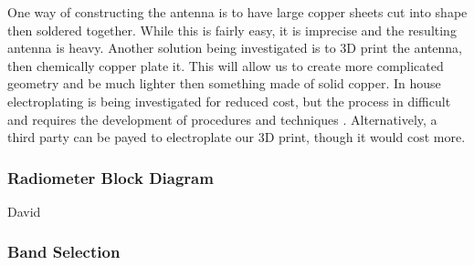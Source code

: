 \documentclass[12pt]{article}
\begin{document}
One way of constructing the antenna is to have large copper sheets cut into shape then soldered together. While
this is fairly easy, it is imprecise and the resulting antenna is heavy. Another solution being investigated is
to 3D print the antenna, then chemically copper plate it. This will allow us to create more complicated geometry
and be much lighter then something made of solid copper. In house electroplating is being investigated for 
reduced cost, but the process in difficult and requires the development of procedures and techniques
\cite{bryancera2014}. Alternatively, a third party can be payed to electroplate our 3D print, though it would 
cost more.

\subsubsection{Radiometer Block Diagram}
David

\subsubsection{Band Selection}
\end{document}
